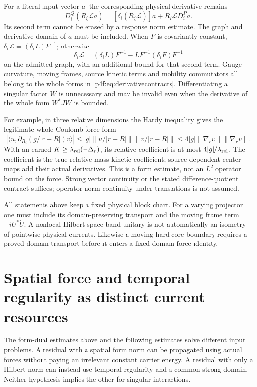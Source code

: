 \documentclass[11pt]{article}
\numberwithin{equation}{section}
\theoremstyle{definition}
\theoremstyle{remark}
\begin{document}
For a literal input vector $a$, the corresponding
physical derivative remains
\begin{equation}\label{p4f:eq:inputspatial}
 D_i^Q(R_\zeta\mathcal L a)
   =[\delta_i(R_\zeta\mathcal L)]a
                        +R_\zeta\mathcal L D_i^Pa .
\end{equation}
Its second term cannot be erased by a response
norm estimate. The graph and derivative domain
of $a$ must be included. When $F$ is covariantly
constant, $\delta_i\mathcal L=(\delta_iL)F^{-1}$;
otherwise
\[
 \delta_i\mathcal L
    =(\delta_iL)F^{-1}
                -LF^{-1}(\delta_iF)F^{-1}
\]
on the admitted graph, with an additional bound
for that second term. Gauge curvature, moving
frames, source kinetic terms and mobility
commutators all belong to the whole forms in
\eqref{p4f:eq:derivativecontracts}.
Differentiating a singular factor $W$ is unnecessary
and may be invalid even when the derivative of
the whole form $W^*JW$ is bounded.

For example, in three relative dimensions the
Hardy inequality gives the legitimate whole
Coulomb force form
\[
 |\langle u,\partial_{R_i}(g/|r-R|)v\rangle|
 \le |g|\|u/|r-R|\|\|v/|r-R|\|
 \le4|g|\|\nabla_r u\|\|\nabla_r v\|.
\]
With an earned $K\ge\lambda_{\rm rel}(-\Delta_r)$,
its relative coefficient is at most
$4|g|/\lambda_{\rm rel}$. The coefficient is
the true relative-mass kinetic coefficient;
source-dependent center maps add their actual
derivatives. This is a form estimate, not an
$L^2$ operator bound on the force. Strong vector
continuity or the stated difference-quotient
contract suffices; operator-norm continuity
under translations is not assumed.

All statements above keep a fixed physical block
chart. For a varying projector one must include
its domain-preserving transport and the moving
frame term $-iU^*\dot U$. A nonlocal Hilbert-space
band unitary is not automatically an isometry
of pointwise physical currents. Likewise a
moving hard-core boundary requires a proved
domain transport before it enters a
fixed-domain force identity.

\section{Spatial force and temporal regularity as distinct current resources}
\label{p4s:sec:forms}

The form-dual estimates above and the following estimates solve different
input problems. A residual with a spatial form norm can be propagated
using actual forces without paying an irrelevant constant carrier
energy. A residual with only a Hilbert norm can instead use temporal
regularity and a common strong domain. Neither hypothesis implies the
other for singular interactions.
\end{document}
